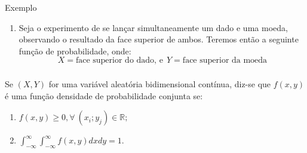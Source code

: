\documentclass[14pt,aspectratio=1610]{beamer}
\begin{document}
\begin{frame}{}
\frametitle{}
\begin{block}{Exemplo}
\justifying
\begin{enumerate}
\item Seja o experimento de se lançar simultaneamente um dado e uma moeda, observando o resultado da face superior de ambos. Teremos então a seguinte
função de probabilidade, onde:
$$X= \textrm{face superior do dado,\ e}\ \ Y=\textrm{face superior da moeda}$$
\end{enumerate}
\vspace{-0.8cm}
\begin{table}[h]
\centering
{}
\end{table}
\end{block}
\end{frame}

\begin{frame}{}
\frametitle{}
\begin{block}{}
\justifying
Se $(X, Y )$ for uma variável aleatória bidimensional contínua, diz-se que
$f(x, y)$ é uma função densidade de probabilidade conjunta se:

\begin{enumerate}
\item $f(x, y)\geq 0, \forall\ (x_{i}; y_{j})\in \mathbb{R};$
\item $\displaystyle \int_{-\infty}^{\infty} \int_{-\infty}^{\infty} f(x, y)dxdy = 1.$
\end{enumerate}
\end{block}
\end{frame}
\end{document}
